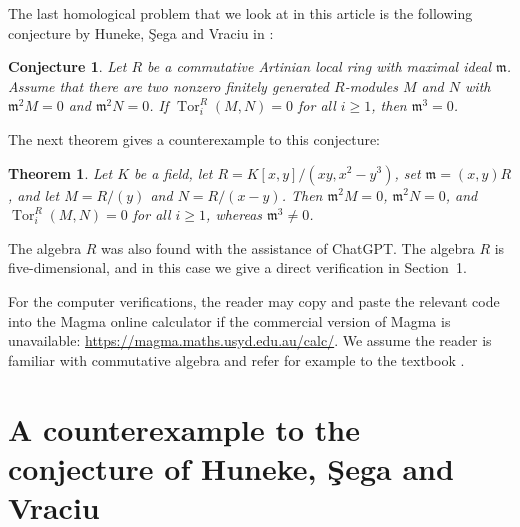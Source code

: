 \documentclass[a4paper]{amsart}
\newtheorem{theorem}{Theorem}[section]
\newtheorem*{conjecture}{Conjecture}
\theoremstyle{definition}
\theoremstyle{remark}
\numberwithin{equation}{section}
\newcommand{\Tor}{\operatorname{Tor}}
\begin{document}
The last homological problem that we look at in this article is the following conjecture by Huneke, \c{S}ega and Vraciu in \cite{HSV}:
\begin{conjecture}
Let $R$ be a commutative Artinian local ring with maximal ideal $\mathfrak{m}$. Assume that there are two nonzero finitely generated $R$-modules $M$ and $N$ with $\mathfrak{m}^2M=0$ and $\mathfrak{m}^2N=0$. If $\Tor_i^R(M,N)=0$ for all $i \geq 1$, then $\mathfrak{m}^3=0$.
\end{conjecture}

The next theorem gives a counterexample to this conjecture:
\begin{theorem}
Let $K$ be a field, let $R=K[x,y]/(xy,x^2-y^3)$, set $\mathfrak m=(x,y)R$, and let $M=R/(y)$ and $N=R/(x-y)$. Then $\mathfrak{m}^2M=0$, $\mathfrak{m}^2N=0$, and $\Tor_i^R(M,N)=0$ for all $i\geq1$, whereas $\mathfrak{m}^3\neq0$.
\end{theorem}
The algebra $R$ was also found with the assistance of ChatGPT.
The algebra $R$ is five-dimensional, and in this case we give a direct verification in Section~1.


For the computer verifications, the reader may copy and paste the relevant code into the Magma online calculator if the commercial version of Magma is unavailable:
\url{https://magma.maths.usyd.edu.au/calc/}.
We assume the reader is familiar with commutative algebra and refer for example to the textbook \cite{E}.
\section{A counterexample to the conjecture of Huneke, \c{S}ega and Vraciu}
\end{document}
